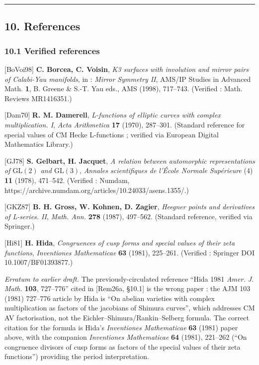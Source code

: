 \documentclass[
  11pt,
  a4paper,
]{amsart}
\begin{document}
\begin{center}\rule{0.5\linewidth}{0.5pt}\end{center}

\hypertarget{references}{%
\subsection{10. References}\label{references}}

\hypertarget{verified-references}{%
\subsubsection{10.1 Verified references}\label{verified-references}}

{[}BoVoi98{]} \textbf{C. Borcea, C. Voisin}, \emph{K3 surfaces with involution and mirror pairs of Calabi-Yau manifolds}, in : \emph{Mirror Symmetry II}, AMS/IP Studies in Advanced Math. \textbf{1}, B. Greene \& S.-T. Yau eds., AMS (1998), 717--743. (Verified : Math. Reviews MR1416351.)

{[}Dam70{]} \textbf{R. M. Damerell}, \emph{L-functions of elliptic curves with complex multiplication. I}, \emph{Acta Arithmetica} \textbf{17} (1970), 287--301. (Standard reference for special values of CM Hecke L-functions ; verified via European Digital Mathematics Library.)

{[}GJ78{]} \textbf{S. Gelbart, H. Jacquet}, \emph{A relation between automorphic representations of \(\mathrm{GL}(2)\) and \(\mathrm{GL}(3)\)}, \emph{Annales scientifiques de l'École Normale Supérieure} (4) \textbf{11} (1978), 471--542. (Verified : Numdam, https://archive.numdam.org/articles/10.24033/asens.1355/.)

{[}GKZ87{]} \textbf{B. H. Gross, W. Kohnen, D. Zagier}, \emph{Heegner points and derivatives of L-series. II}, \emph{Math. Ann.} \textbf{278} (1987), 497--562. (Standard reference, verified via Springer.)

{[}Hi81{]} \textbf{H. Hida}, \emph{Congruences of cusp forms and special values of their zeta functions}, \emph{Inventiones Mathematicae} \textbf{63} (1981), 225--261. (Verified : Springer DOI 10.1007/BF01393877.)

\emph{Erratum to earlier draft.} The previously-circulated reference ``Hida 1981 \emph{Amer. J. Math.} \textbf{103}, 727--776'' cited in {[}Rem26a, §10.1{]} is the wrong paper : the AJM 103 (1981) 727--776 article by Hida is ``On abelian varieties with complex multiplication as factors of the jacobians of Shimura curves'', which addresses CM AV factorisation, not the Eichler--Shimura/Rankin--Selberg formula. The correct citation for the formula is Hida's \emph{Inventiones Mathematicae} \textbf{63} (1981) paper above, with the companion \emph{Inventiones Mathematicae} \textbf{64} (1981), 221--262 (``On congruence divisors of cusp forms as factors of the special values of their zeta functions'') providing the period interpretation.
\end{document}
